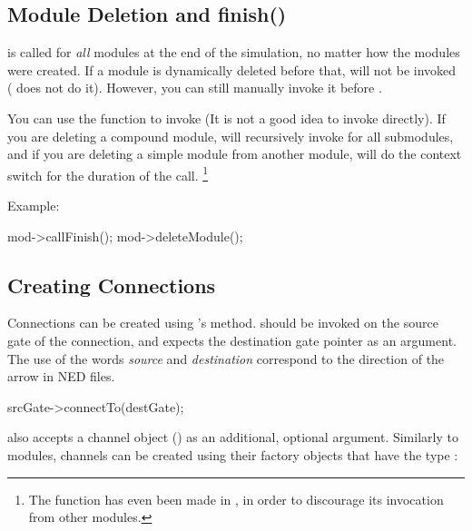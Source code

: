 \subsection{Module Deletion and finish()}
\label{sec:simple-modules:module-deletion-and-finish}

 is called for \textit{all} modules at the end of the
simulation, no matter how the modules were created. If a module is
dynamically deleted before that,  will not be invoked
( does not do it). However, you can still manually
invoke it before .

You can use the  function to invoke 
(It is not a good idea to invoke  directly). If you are
deleting a compound module,  will recursively invoke
 for all submodules, and if you are deleting a simple
module from another module,  will do the context switch
for the duration of the call.
  \footnote{The  function has even been made 
  in , in order to discourage its invocation from
  other modules.}

Example:

\begin{cpp}
mod->callFinish();
mod->deleteModule();
\end{cpp}


\subsection{Creating Connections}
\label{sec:simple-modules:creating-connections}

Connections can be created using 's 
method.  should be invoked on the source gate
of the connection, and expects the destination gate pointer as
an argument. The use of the words \textit{source} and \textit{destination}
correspond to the direction of the arrow in NED files.

\begin{cpp}
srcGate->connectTo(destGate);
\end{cpp}

 also accepts a channel object () as an
additional, optional argument. Similarly to modules, channels can be
created using their factory objects that have the type :

